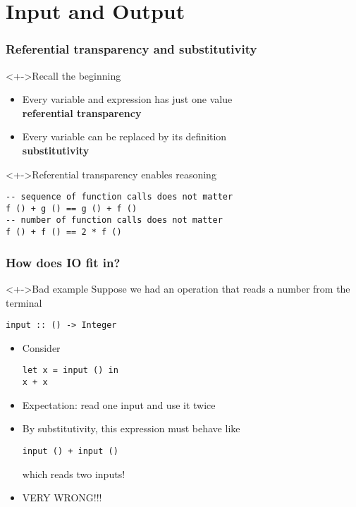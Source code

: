 \documentclass{beamer}
\begin{document}
\section{Input and Output}
\begin{frame}[fragile]
  \frametitle{Referential transparency and substitutivity}
  \begin{block}<+->{Recall the beginning}
    \begin{itemize}
    \item Every variable and expression has just one value\\
      \textbf{referential transparency}
    \item Every variable can be replaced by its definition\\
      \textbf{substitutivity}
    \end{itemize}
  \end{block}
  \begin{block}<+->{Referential transparency enables reasoning}
\begin{lstlisting}
-- sequence of function calls does not matter
f () + g () == g () + f ()
-- number of function calls does not matter
f () + f () == 2 * f ()
\end{lstlisting}
  \end{block}
\end{frame}
\begin{frame}[fragile]
  \frametitle{How does IO fit in?}
  \begin{alertblock}<+->{Bad example}
    Suppose we had an operation that reads a number from the terminal
\begin{lstlisting}
input :: () -> Integer
\end{lstlisting}
    \begin{itemize}
    \item<+-> Consider
\begin{lstlisting}
let x = input () in
x + x
\end{lstlisting}
    \item<+-> Expectation: read one input and use it twice
    \item<+-> By substitutivity, this expression must behave like
\begin{lstlisting}
input () + input ()
\end{lstlisting}
      which reads two inputs!
    \item<+-> VERY WRONG!!!
  \end{itemize}
  \end{alertblock}
\end{frame}
\end{document}
